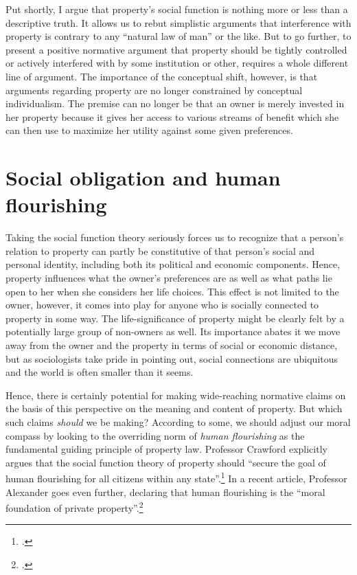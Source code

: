 Put shortly, I argue that property's social function is nothing more or less than a descriptive truth. It allows us to rebut simplistic arguments that interference with property is contrary to any ``natural law of man'' or the like. But to go further, to present a positive normative argument that property should be tightly controlled or actively interfered with by some institution or other, requires a whole different line of argument. The importance of the conceptual shift, however, is that arguments regarding property are no longer constrained by conceptual individualism. The premise can no longer be that an owner is merely invested in her property because it gives her access to various streams of benefit which she can then use to maximize her utility against some given preferences. 

\section{Social obligation and human flourishing}

Taking the social function theory seriously forces us to recognize that a person's relation to property can partly be constitutive of that person's social and personal identity, including both its political and economic components. Hence, property influences what the owner's preferences are as well as what paths lie open to her when she considers her life choices. This effect is not limited to the owner, however, it comes into play for anyone who is socially connected to property in some way. The life-significance of property might be clearly felt by a potentially large group of non-owners as well. Its importance abates it we move away from the owner and the property in terms of social or economic distance, but as sociologists take pride in pointing out, social connections are ubiquitous  and the world is often smaller than it seems. 

Hence, there is certainly potential for making wide-reaching normative claims on the basis of this perspective on the meaning and content of property. But which such claims {\it should} we be making? According to some, we should adjust our moral compass by looking to the overriding norm of {\it human flourishing} as the fundamental guiding principle of property law. Professor Crawford explicitly argues that the social function theory of property should ``secure the goal of human flourishing for all citizens within any state''.\footcite[10089]{crawford12} In a recent article, Professor Alexander goes even further, declaring that human flourishing is the ``moral foundation of private property''.\footcite[1261]{alexander14} 

